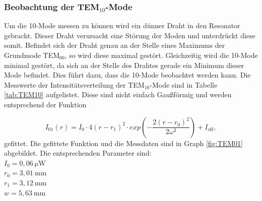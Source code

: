\subsubsection{Beobachtung der TEM$_{10}$-Mode}
\label{sec:Beobachtung der EINFÜGEN-Mode}
Um die 10-Mode messen zu können wird ein dünner Draht in den Resonator gebracht.
Dieser Draht verursacht eine Störung der Moden und unterdrückt diese somit. Befindet sich der Draht genau an der Stelle eines Maximums der Grundmode TEM$_{00}$, so wird diese maximal gestört.
Gleichzeitig wird die 10-Mode minimal gestört, da sich an der Stelle des Drahtes gerade ein Minimum dieser Mode befindet. Dies führt dazu, dass die 10-Mode beobachtet werden kann.
Die Messwerte der Intensitätsverteilung der TEM$_{10}$-Mode sind in Tabelle \ref{tab:TEM10} aufgelistet. Diese sind nicht einfach Gaußförmig und werden entsprechend der Funktion

\begin{equation}
  I_{01}(r) = I_0 \cdot 4 (r - r_1)^2 \cdot exp \left( - \frac{2 (r - r_0)^2}{2 \omega^2}\right) + I_{\text{off}},
\end{equation}
gefittet. Die gefittete Funktion und die Messdaten sind in Graph \ref{fig:TEM01} abgebildet.
Die entsprechenden Parameter sind: \\
$I_0 = 0,06 \: \si{\micro\watt}$ \\
$r_0 = 3,01 \: \si{\milli\meter}$ \\
$r_1 = 3,12 \: \si{\milli\meter}$ \\
$w = 5,63 \: \si{\milli\meter}$ \\


